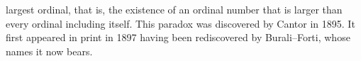 largest ordinal, that is, the existence of an ordinal number that is larger than every ordinal including itself. This paradox was discovered by Cantor in 1895. It first appeared in print in 1897 having been rediscovered by Burali–Forti, whose names it now bears.
